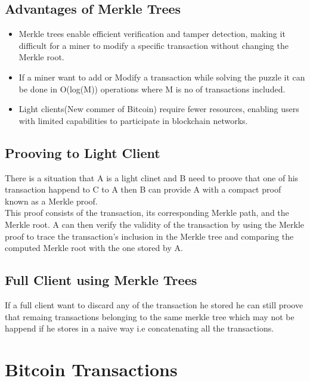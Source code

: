 \documentclass{article}
\begin{document}
\subsection{Advantages of Merkle Trees}
\begin{itemize}
    \item Merkle trees enable efficient verification and tamper detection, making it difficult for a miner to modify a specific transaction without changing the Merkle root.
    \item If a miner want to add or Modify a transaction while solving the puzzle it can be done in O(log(M)) operations where M is no of transactions included.
    \item Light clients(New commer of Bitcoin) require fewer resources, enabling users with limited capabilities to participate in blockchain networks.
\end{itemize}
\subsection{Prooving to Light Client}
There is a situation that A is a light clinet and B need to proove that one of his transaction happend to C to A then B can provide A with a compact proof known as a Merkle proof. \\
This proof consists of the transaction, its corresponding Merkle path, and the Merkle root. A can then verify the validity of the transaction by using the Merkle proof to trace the transaction's inclusion in the Merkle tree and comparing the computed Merkle root with the one stored by A.
\subsection{Full Client using Merkle Trees}
If a full client want to discard any of the transaction he stored he can still proove that remaing transactions belonging to the same merkle tree which may not be happend if he stores in a naive way i.e concatenating all the transactions.
\section{Bitcoin Transactions}
\end{document}
